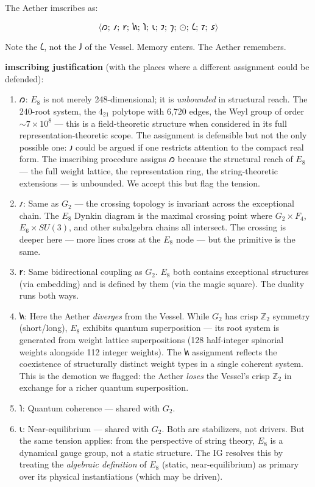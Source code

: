 \documentclass[12pt,a4paper]{article}
\begin{document}
The Aether imscribes as:

\[\langle 𐑼;\ 𐑥;\ 𐑾;\ 𐑿;\ 𐑐;\ 𐑧;\ 𐑲;\ 𐑠;\ ⊙;\ 𐑖;\ 𐑳;\ 𐑭 \rangle\]

Note the $𐑖$, not the $𐑓$ of the Vessel. Memory enters. The Aether remembers.

\textbf{imscribing justification} (with the places where a different assignment could be defended):

\begin{enumerate}
    \item \textbf{$𐑼$}: $E_8$ is not merely 248-dimensional; it is \emph{unbounded} in structural reach. The 240-root system, the $4_{21}$ polytope with 6,720 edges, the Weyl group of order $\sim 7 \times 10^8$ --- this is a field-theoretic structure when considered in its full representation-theoretic scope. The assignment is defensible but not the only possible one: $𐑨$ could be argued if one restricts attention to the compact real form. The imscribing procedure assigns $𐑼$ because the structural reach of $E_8$ --- the full weight lattice, the representation ring, the string-theoretic extensions --- is unbounded. We accept this but flag the tension.
    \item \textbf{$𐑥$}: Same as $G_2$ --- the crossing topology is invariant across the exceptional chain. The $E_8$ Dynkin diagram is the maximal crossing point where $G_2 \times F_4$, $E_6 \times SU(3)$, and other subalgebra chains all intersect. The crossing is deeper here --- more lines cross at the $E_8$ node --- but the primitive is the same.
    \item \textbf{$𐑾$}: Same bidirectional coupling as $G_2$. $E_8$ both contains exceptional structures (via embedding) and is defined by them (via the magic square). The duality runs both ways.
    \item \textbf{$𐑿$}: Here the Aether \emph{diverges} from the Vessel. While $G_2$ has crisp $\mathbb{Z}_2$ symmetry (short/long), $E_8$ exhibits quantum superposition --- its root system is generated from weight lattice superpositions (128 half-integer spinorial weights alongside 112 integer weights). The $𐑿$ assignment reflects the coexistence of structurally distinct weight types in a single coherent system. This is the demotion we flagged: the Aether \emph{loses} the Vessel's crisp $\mathbb{Z}_2$ in exchange for a richer quantum superposition.
    \item \textbf{$𐑐$}: Quantum coherence --- shared with $G_2$.
    \item \textbf{$𐑧$}: Near-equilibrium --- shared with $G_2$. Both are stabilizers, not drivers. But the same tension applies: from the perspective of string theory, $E_8$ is a dynamical gauge group, not a static structure. The IG resolves this by treating the \emph{algebraic definition} of $E_8$ (static, near-equilibrium) as primary over its physical instantiations (which may be driven).

\end{enumerate}
\end{document}

